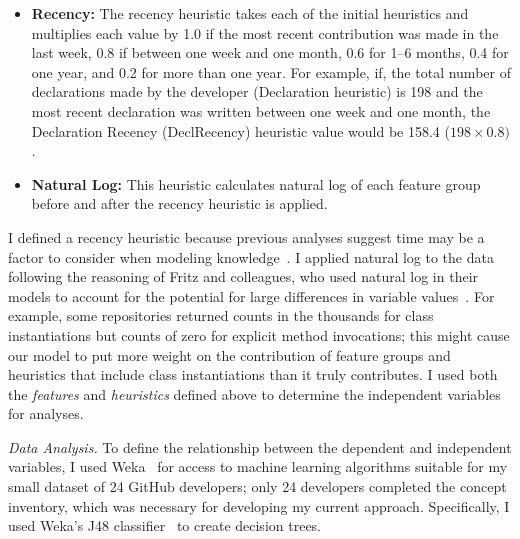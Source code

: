 \documentclass{llncs}
\begin{document}
\begin{itemize}
	\item \textbf{Recency:} The recency heuristic takes each of the initial heuristics and multiplies each value by 1.0 if the most recent contribution was made in the last week, 0.8 if between one week and one month, 0.6 for 1--6 months, 0.4 for one year, and 0.2 for more than one year.
	For example, if, the total number of declarations made by the developer (Declaration heuristic) is 198 and the most recent declaration was written between one week and one month, the Declaration Recency (DeclRecency) heuristic value would be 158.4 (\(198 \times 0.8)\). 
	\item \textbf{Natural Log:} This heuristic calculates natural log of each feature group before and after the recency heuristic is applied.
\end{itemize}

I defined a recency heuristic because previous analyses suggest time may be a factor to consider when modeling knowledge~\cite{johnson2015bespoke}.	
I applied natural log to the data following the reasoning of Fritz and colleagues, who used natural log in their models to account for the potential for large differences in variable values~\cite{fritz2010degree}. For example, some repositories returned counts in the thousands for class instantiations but counts of zero for explicit method invocations; this might cause our model to put more weight on the contribution of feature groups and heuristics that include class instantiations than it truly contributes.
I used both the \emph{features} and \emph{heuristics} defined above to determine the independent variables for analyses.

\vspace{0.5em}
\noindent\textit{Data Analysis.} %
To define the relationship between the dependent and independent variables, I used Weka~\cite{Hall:2009:WDM:1656274.1656278} for access to machine learning algorithms suitable for my small dataset of 24 GitHub developers; only 24 developers completed the concept inventory, which was necessary for developing my current approach. 
Specifically, I used Weka's J48 classifier~\cite{witten1999weka} to create decision trees.
\end{document}
